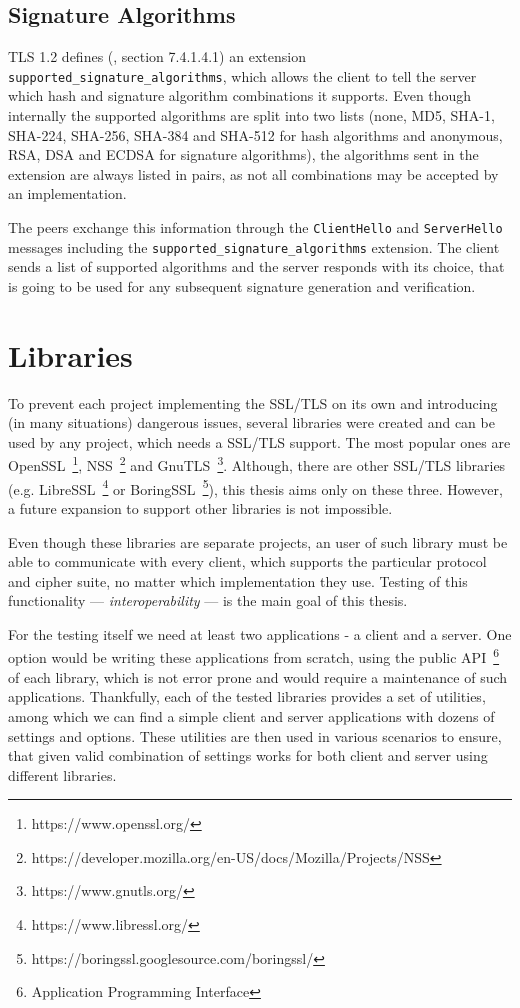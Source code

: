 \subsection{Signature Algorithms} \label{ref:signature-algorithms}
    TLS 1.2 defines (\cite{rfc5246}, section 7.4.1.4.1) an extension
    \texttt{supported\_signature\_algorithms}, which allows the client to tell
    the server which hash and signature algorithm combinations it supports.
    Even though internally the supported algorithms are split into two lists
    (none, MD5, SHA-1, SHA-224, SHA-256, SHA-384 and SHA-512 for hash algorithms
    and anonymous, RSA, DSA and ECDSA for signature algorithms), the algorithms
    sent in the extension are always listed in pairs, as not all combinations
    may be accepted by an implementation.

    The peers exchange this information through the \texttt{ClientHello} and
    \texttt{ServerHello} messages including the \texttt{supported\_signature\_algorithms}
    extension. The client sends a list of supported algorithms and the server
    responds with its choice, that is going to be used for any subsequent signature
    generation and verification.

\section{Libraries}
    To prevent each project implementing the SSL/TLS on its own and introducing
    (in many situations) dangerous issues, several libraries were created and
    can be used by any project, which needs a SSL/TLS support. The most
    popular ones are OpenSSL~\footnote{https://www.openssl.org/},
    NSS~\footnote{https://developer.mozilla.org/en-US/docs/Mozilla/Projects/NSS}
    and GnuTLS~\footnote{https://www.gnutls.org/}. Although, there are other
    SSL/TLS libraries (e.g. LibreSSL~\footnote{https://www.libressl.org/} or
    BoringSSL~\footnote{https://boringssl.googlesource.com/boringssl/}),
    this thesis aims only on these three. However, a future
    expansion to support other libraries is not impossible.

    Even though these libraries are
    separate projects, an user of such library must be able to communicate with every client,
    which supports the particular protocol and cipher suite, no matter which
    implementation they use. Testing of this functionality --- \textit{interoperability} ---
    is the main goal of this thesis.

    For the testing itself we need at least two applications - a client and a server.
    One option would be writing these applications from scratch, using the public
    API~\footnote{Application Programming Interface} of each library,
    which is not error prone and would require a maintenance of such applications.
    Thankfully, each of the tested libraries provides a set of utilities,
    among which we can find a simple client and server applications with
    dozens of settings and options. These utilities are then used in
    various scenarios to ensure, that given valid combination of settings works
    for both client and server using different libraries.

